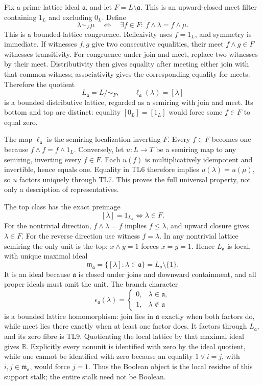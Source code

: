 Fix a prime lattice ideal \(\mathfrak a\), and let
\(F=L\setminus\mathfrak a\). This is an upward-closed meet filter
containing \(1_L\) and excluding \(0_L\). Define \[
 \lambda\sim_F\mu
 \quad\Longleftrightarrow\quad
 \exists f\in F:\ f\wedge\lambda=f\wedge\mu.
 \tag{TL6}
\] This is a bounded-lattice congruence. Reflexivity uses \(f=1_L\), and
symmetry is immediate. If witnesses \(f,g\) give two consecutive
equalities, their meet \(f\wedge g\in F\) witnesses transitivity. For
congruence under join and meet, replace two witnesses by their meet.
Distributivity then gives equality after meeting either join with that
common witness; associativity gives the corresponding equality for
meets. Therefore the quotient \[
 L_{\mathfrak a}=L/{\sim_F},\qquad \ell_{\mathfrak a}(\lambda)=[\lambda]
 \tag{TL7}
\] is a bounded distributive lattice, regarded as a semiring with join
and meet. Its bottom and top are distinct: equality \([0_L]=[1_L]\)
would force some \(f\in F\) to equal zero.

The map \(\ell_{\mathfrak a}\) is the semiring localization inverting
\(F\). Every \(f\in F\) becomes one because \(f\wedge f=f\wedge1_L\).
Conversely, let \(u:L\to T\) be a semiring map to any semiring,
inverting every \(f\in F\). Each \(u(f)\) is multiplicatively idempotent
and invertible, hence equals one. Equality in TL6 therefore implies
\(u(\lambda)=u(\mu)\), so \(u\) factors uniquely through TL7. This
proves the full universal property, not only a description of
representatives.

The top class has the exact preimage \[
 [\lambda]=1_{L_{\mathfrak a}}\iff\lambda\in F.
 \tag{TL8}
\] For the nontrivial direction, \(f\wedge\lambda=f\) implies
\(f\le\lambda\), and upward closure gives \(\lambda\in F\). For the
reverse direction use witness \(f=\lambda\). In any nontrivial lattice
semiring the only unit is the top: \(x\wedge y=1\) forces \(x=y=1\).
Hence \(L_{\mathfrak a}\) is local, with unique maximal ideal \[
 \mathfrak m_{\mathfrak a}=\{[\lambda]:\lambda\in\mathfrak a\}
 =L_{\mathfrak a}\setminus\{1\}.
 \tag{TL9}
\] It is an ideal because \(\mathfrak a\) is closed under joins and
downward containment, and all proper ideals must omit the unit. The
branch character \[
 \epsilon_{\mathfrak a}(\lambda)=
 \begin{cases}0,&\lambda\in\mathfrak a,\\1,&\lambda\notin\mathfrak a\end{cases}
 \tag{TL10}
\] is a bounded lattice homomorphism: join lies in \(\mathfrak a\)
exactly when both factors do, while meet lies there exactly when at
least one factor does. It factors through \(L_{\mathfrak a}\), and its
zero fibre is TL9. Quotienting the local lattice by that maximal ideal
gives \(\mathbb B\). Explicitly every nonunit is identified with zero by
the ideal quotient, while one cannot be identified with zero because an
equality \(1\vee i=j\), with \(i,j\in\mathfrak m_{\mathfrak a}\), would
force \(j=1\). Thus the Boolean object is the local residue of this
support stalk; the entire stalk need not be Boolean.

